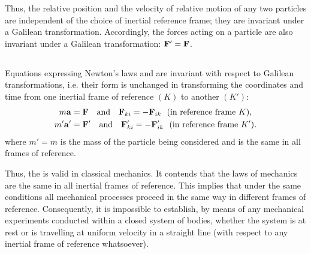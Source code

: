 Thus, the relative position and the velocity of relative motion of any two particles are independent of the choice of inertial reference frame; they are invariant under a Galilean transfor­mation. Accordingly, the forces acting on a particle are also invariant under a Galilean transformation: $\vb{F}' = \vb{F}$.

\subsection{}\label{2.8.4} Equations expressing Newton's laws  and  are invariant with respect to Galilean transformations, i.e. their form is unchanged in transforming the coordinates and time from one inertial frame of reference $(K)$ to another $(K')$:
\begin{align*}%
m\vb{a} & = \vb{F} \qand \vb{F}_{ki} = - \vb{F}_{ik} \,\, \text{ (in reference frame } K),\\
m'\vb{a}' & = \vb{F}' \qand \vb{F}_{ki}' = - \vb{F}_{ik}' \,\, \text{ (in reference frame } K').
\end{align*}
where $m' = m$ is the mass of the particle being considered and is the same in all frames of reference.

Thus, the  is valid in classical mechanics. It contends that the laws of mechanics are the same in all inertial frames of ref­erence. This implies that under the same conditions all mechan­ical processes proceed in the same way in different frames of reference. Consequently, it is impossible to establish, by means of any mechanical experiments conducted within a closed sys­tem of bodies, whether the system is at rest or is travelling at uniform velocity in a straight line (with respect to any inertial frame of reference whatsoever).

